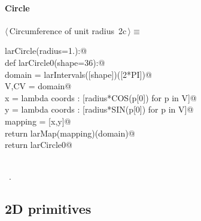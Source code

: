 \documentclass[11pt,oneside]{article}	%
\begin{document}
\paragraph{Circle}
\begin{flushleft} \small \label{scrap4}
\protect{}$\langle\,$Circumference of unit radius\nobreak\ {\footnotesize 2c}$\,\rangle\equiv$
\vspace{-1ex}
\begin{list}{}{} \item
\mbox{}\verb@def larCircle(radius=1.):@\\
\mbox{}\verb@   def larCircle0(shape=36):@\\
\mbox{}\verb@      domain = larIntervals([shape])([2*PI])@\\
\mbox{}\verb@      V,CV = domain@\\
\mbox{}\verb@      x = lambda coords : [radius*COS(p[0]) for p in V]@\\
\mbox{}\verb@      y = lambda coords : [radius*SIN(p[0]) for p in V]@\\
\mbox{}\verb@      mapping = [x,y]@\\
\mbox{}\verb@      return larMap(mapping)(domain)@\\
\mbox{}\verb@   return larCircle0@\\
\mbox{}\verb@@\\
\mbox{}\verb@@{\NWsep}
\end{list}
\vspace{-1ex}
\footnotesize\addtolength{\baselineskip}{-1ex}
\begin{list}{}{\setlength{\itemsep}{-\parsep}\setlength{\itemindent}{-\leftmargin}}
\item \NWtxtMacroRefIn\ .
\end{list}
\end{flushleft}
\subsection{2D primitives}
\end{document}
